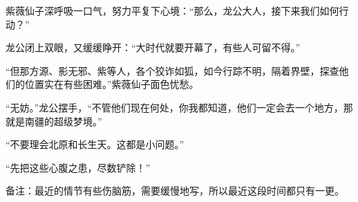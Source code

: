 \begin{this_body}
紫薇仙子深呼吸一口气，努力平复下心境：“那么，龙公大人，接下来我们如何行动？”

龙公闭上双眼，又缓缓睁开：“大时代就要开幕了，有些人可留不得。”

“但那方源、影无邪、紫等人，各个狡诈如狐，如今行踪不明，隔着界壁，探查他们的位置实在有些困难。”紫薇仙子面色忧愁。

“无妨。”龙公摆手，“不管他们现在何处，你我都知道，他们一定会去一个地方，那就是南疆的超级梦境。”

“不要理会北原和长生天。这都是小问题。”

“先把这些心腹之患，尽数铲除！”

备注：最近的情节有些伤脑筋，需要缓慢地写，所以最近这段时间都只有一更。

\end{this_body}

